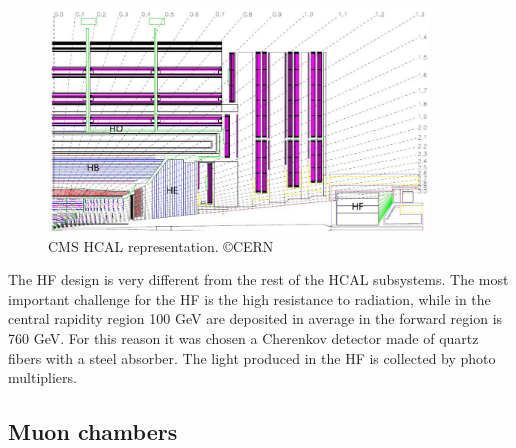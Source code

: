 \begin{figure}[!Hhtbp]
  \begin{center}
    \includegraphics[width=0.9\textwidth]{figs/HCAL.png}
    \caption{CMS HCAL representation. \copyright CERN}
    \label{fig:hcal}
  \end{center}
\end{figure}

The HF design is very different from the rest of the HCAL subsystems. The most important challenge for the HF is the high resistance to radiation, while in the central rapidity region 100 GeV are deposited in average in the forward region is 760 GeV. For this reason it was chosen a Cherenkov detector made of quartz fibers with a steel absorber. The light produced in the HF is collected by photo multipliers. 

\subsection{Muon chambers}
\label{sec:muons}

